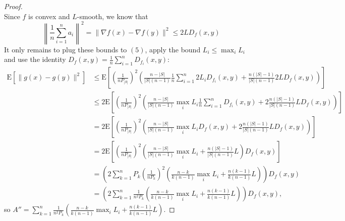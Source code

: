 \documentclass[12pt,a4paper]{article}
\begin{document}
\begin{proof}
$$	$$
	Since $f$ is convex and $L$-smooth, we know that
	$$
	\left\|\frac{1}{n} \sum_{i=1}^{n} a_{i}\right\|^{2} \stackrel{}{=}\|\nabla f(x)-\nabla f(y)\|^{2} \leq 2 L D_{f}(x, y)
	$$
	It only remains to plug these bounds to $(5)$, apply the bound $L_{i} \leq \max _{i} L_{i}$ and use the identity $D_{f}(x, y)=\frac{1}{n} \sum_{i=1}^{n} D_{f_{i}}(x, y):$
	$$
	\begin{aligned}
		\mathrm{E}\left[\|g(x)-g(y)\|^{2}\right] & \stackrel{}{\leq} \mathrm{E}\left[(\frac{1}{nP_{|S|}})^2\left(\frac{n-|S|}{|S|(n-1)} \frac{1}{n} \sum_{i=1}^{n} 2 L_{i} D_{f_{i}}(x, y)+\frac{n(|S|-1)}{|S|(n-1)} 2 L D_{f}(x, y)\right)\right] \\
		& \leq 2\mathrm{E}\left[(\frac{1}{nP_{|S|}})^2\left( \frac{n-|S|}{|S|(n-1)} \max _{i} L_{i} \frac{1}{n} \sum_{i=1}^{n} D_{f_{i}}(x, y)+2 \frac{n(|S|-1)}{|S|(n-1)} L D_{f}(x, y) \right)\right]\\
		&=2\mathrm{E}\left[(\frac{1}{nP_{|S|}})^2\left( \frac{n-|S|}{|S|(n-1)} \max _{i} L_{i} D_{f}(x, y)+2 \frac{n(|S|-1)}{|S|(n-1)} L D_{f}(x, y)\right)\right] \\
		&=2\mathrm{E}\left[(\frac{1}{nP_{|S|}})^2\left(\frac{n-|S|}{|S|(n-1)} \max _{i} L_{i}+\frac{n(|S|-1)}{|S|(n-1)} L\right) D_{f}(x, y)\right]\\
		&=\left(2\sum_{k=1}^n P_k(\frac{1}{nP_k})^2\left(\frac{n-k}{k(n-1)} \max _{i} L_{i}+\frac{n(k-1)}{k(n-1)} L\right) \right)D_{f}(x, y) \\
		&=\left(2\sum_{k=1}^n \frac{1}{n^2P_k}\left(\frac{n-k}{k(n-1)} \max _{i} L_{i}+\frac{n(k-1)}{k(n-1)} L\right)\right) D_{f}(x, y),
	\end{aligned}
	$$
	so $A'' =\sum_{k=1}^n \frac{1}{n^2P_k}\left(\frac{n-k}{k(n-1)} \max _{i} L_{i}+\frac{n(k-1)}{k(n-1)} L\right)$.
	
\end{proof}
\end{document}
